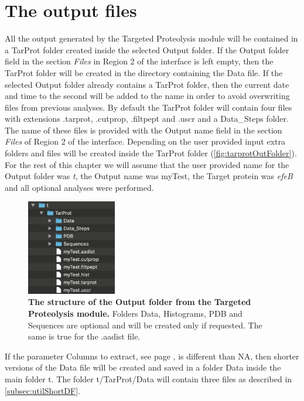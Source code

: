\section{The output files}

All the output generated by the Targeted Proteolysis module will be contained in a TarProt folder created inside the selected Output folder. If the Output folder field in the section \textit{Files} in Region \num{2} of the interface is left empty, then the TarProt folder will be created in the directory containing the Data file. If the selected Output folder already contains a TarProt folder, then the current date and time to the second will be added to the name in order to avoid overwriting files from previous analyses. By default the TarProt folder will contain four files with extensions .tarprot, .cutprop, .filtpept and .uscr and a Data{\_}Steps folder. The name of these files is provided with the Output name field in the section \textit{Files} of Region \num{2} of the interface. Depending on the user provided input extra folders and files will be created inside the TarProt folder (\autoref{fig:tarprotOutFolder}). For the rest of this chapter we will assume that the user provided name for the Output folder was \textit{t}, the Output name was myTest, the Target protein was \textit{efeB} and all optional analyses were performed.

\begin{figure}[h]
	\centering
	\includegraphics[width=0.35\textwidth]{./IMAGES/MOD-TARPROT/tarprot-files.jpg}	    
	\caption[The structure of the Output folder from the Targeted Proteolysis module]{\textbf{The structure of the Output folder from the Targeted Proteolysis module.} Folders Data, Histograms, PDB and Sequences are optional and will be created only if requested. The same is true for the .aadist file.} 
	\label{fig:tarprotOutFolder}
	\vspace{-5pt} 	
\end{figure} 

If the parameter Columns to extract, see page \pageref{par:tarprotColExt}, is different than NA, then shorter versions of the Data file will be created and saved in a folder Data inside the main folder t. The folder t/TarProt/Data will\label{par:tarprotDataFiles} contain three files as described in \autoref{subsec:utilShortDF}.

